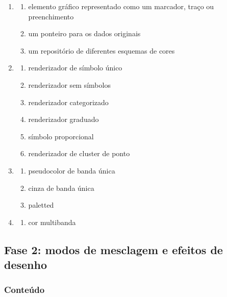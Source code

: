 \documentclass[
]{book}
\providecommand{\tightlist}{%
  \setlength{\itemsep}{0pt}\setlength{\parskip}{0pt}}
\begin{document}
\begin{enumerate}
\def\labelenumi{\arabic{enumi}.}
\item
  \begin{enumerate}
  \def\labelenumii{\alph{enumii}.}
  \tightlist
  \item
    elemento gráfico representado como um marcador, traço ou preenchimento
  \item
    um ponteiro para os dados originais
  \item
    um repositório de diferentes esquemas de cores
  \end{enumerate}
\item
  \begin{enumerate}
  \def\labelenumii{\alph{enumii}.}
  \tightlist
  \item
    renderizador de símbolo único
  \item
    renderizador sem símbolos
  \item
    renderizador categorizado
  \item
    renderizador graduado
  \item
    símbolo proporcional
  \item
    renderizador de cluster de ponto
  \end{enumerate}
\item
  \begin{enumerate}
  \def\labelenumii{\alph{enumii}.}
  \tightlist
  \item
    pseudocolor de banda única
  \item
    cinza de banda única
  \item
    paletted
  \end{enumerate}
\item
  \begin{enumerate}
  \def\labelenumii{\alph{enumii}.}
  \setcounter{enumii}{3}
  \tightlist
  \item
    cor multibanda
  \end{enumerate}
\end{enumerate}

\hypertarget{fase-2-modos-de-mesclagem-e-efeitos-de-desenho}{%
\subsection{Fase 2: modos de mesclagem e efeitos de desenho}\label{fase-2-modos-de-mesclagem-e-efeitos-de-desenho}}

\hypertarget{conteuxfado-1}{%
\subsubsection{\texorpdfstring{\textbf{Conteúdo}}{Conteúdo}}\label{conteuxfado-1}}
\end{document}
